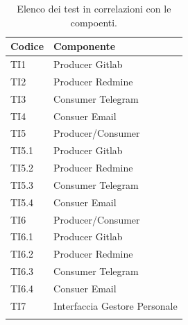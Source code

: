 	\begin{table}[H]
		\centering
		{\def\arraystretch{1.4}
		\begin{tabularx}{\textwidth}{YY}
			\textbf{Codice} & \textbf{Componente} \\
			\toprule
			TI1 & Producer Gitlab \\
			TI2 & Producer Redmine \\
			TI3 & Consumer Telegram \\
			TI4 & Consuer Email \\
			TI5 & Producer/Consumer \\
			TI5.1 & Producer Gitlab \\
			TI5.2 & Producer Redmine \\
			TI5.3 & Consumer Telegram \\
			TI5.4 & Consuer Email \\
			TI6 & Producer/Consumer \\
			TI6.1 & Producer Gitlab \\
			TI6.2 & Producer Redmine \\
			TI6.3 & Consumer Telegram \\
			TI6.4 & Consuer Email \\
			TI7 & Interfaccia Gestore Personale \\
			\bottomrule\\
		\end{tabularx}}
		\caption{Elenco dei test in correlazioni con le compoenti.}
	\end{table}
